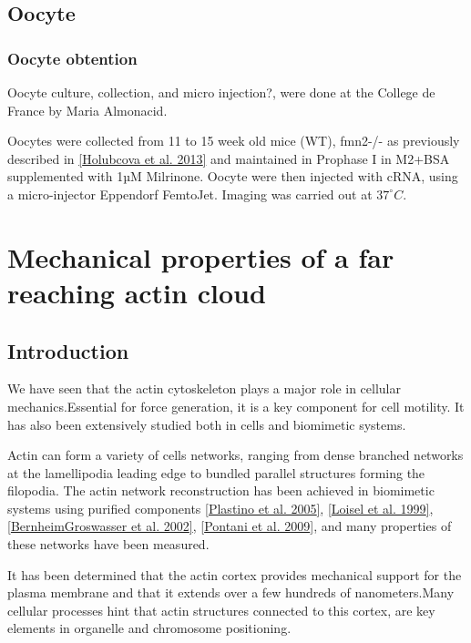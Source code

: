 \documentclass[A4paperpaper,11pt,english]{sphinxmanual}
\begin{document}
\section{Oocyte}
\label{index-latex:oocyte}

\subsection{Oocyte obtention}
\label{index-latex:oocyte-obtention}
Oocyte culture, collection, and micro injection?, were done at the College de France by Maria Almonacid.

Oocytes were collected from 11 to 15 week old mice (WT), fmn2-/- as previously
described in {\hyperref[index-latex:holubcova2013]{{[}Holubcova et al. 2013{]}}} and maintained in Prophase I in M2+BSA
supplemented with  1µM Milrinone. Oocyte were then injected with cRNA,  using a
micro-injector Eppendorf FemtoJet. Imaging was carried out at \(37^\circ{}C\).


\chapter{Mechanical properties of a far reaching actin cloud}
\label{index-latex:mechanical-properties-of-a-far-reaching-actin-cloud}\label{index-latex::doc}

\section{Introduction}
\label{index-latex:introduction}
We have seen that the actin cytoskeleton plays a major role in
cellular mechanics.Essential for force generation, it is a
key component for cell motility. It has also been extensively studied both in
cells and biomimetic systems.

Actin can form a variety of cells networks, ranging from dense branched
networks at the lamellipodia leading edge to bundled parallel structures
forming the filopodia.  The actin network reconstruction has been achieved in
biomimetic systems using purified components {\hyperref[index-latex:plastino2005]{{[}Plastino et al. 2005{]}}},
{\hyperref[index-latex:loisel1999]{{[}Loisel et al. 1999{]}}}, {\hyperref[index-latex:bernheim-groswasser2002]{{[}BernheimGroswasser et al. 2002{]}}},  {\hyperref[index-latex:pontani2009]{{[}Pontani et al. 2009{]}}}, and
many properties of these networks have been measured.

It has been determined that the actin cortex provides mechanical support for the
plasma membrane and that it extends over a few hundreds of nanometers.Many
cellular processes hint that actin structures connected to this cortex, are
key elements in organelle and chromosome positioning.
\end{document}
